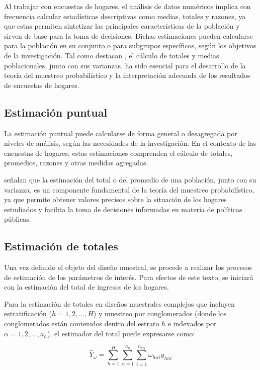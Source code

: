 \documentclass[
  spanish,
  12pt,
]{book}
\begin{document}
Al trabajar con encuestas de hogares, el análisis de datos numéricos implica con frecuencia calcular estadísticas descriptivas como medias, totales y razones, ya que estas permiten sintetizar las principales características de la población y sirven de base para la toma de decisiones. Dichas estimaciones pueden calcularse para la población en su conjunto o para subgrupos específicos, según los objetivos de la investigación. Tal como destacan \citet{heeringa2017applied}, el cálculo de totales y medias poblacionales, junto con sus varianzas, ha sido esencial para el desarrollo de la teoría del muestreo probabilístico y la interpretación adecuada de los resultados de encuestas de hogares.

\subsection{Estimación puntual}\label{estimaciuxf3n-puntual}

La estimación puntual puede calcularse de forma general o desagregada por niveles de análisis, según las necesidades de la investigación. En el contexto de las encuestas de hogares, estas estimaciones comprenden el cálculo de totales, promedios, razones y otras medidas agregadas.

\citet{heeringa2017applied} señalan que la estimación del total o del promedio de una población, junto con su varianza, es un componente fundamental de la teoría del muestreo probabilístico, ya que permite obtener valores precisos sobre la situación de los hogares estudiados y facilita la toma de decisiones informadas en materia de políticas públicas.

\subsection{Estimación de totales}\label{estimaciuxf3n-de-totales-1}

Una vez definido el objeto del diseño muestral, se procede a realizar los procesos de estimación de los parámetros de interés. Para efectos de este texto, se iniciará con la estimación del total de ingresos de los hogares.

Para la estimación de totales en diseños muestrales complejos que incluyen estratificación (\(h = 1, 2, \ldots, H\)) y muestreo por conglomerados (donde los conglomerados están contenidos dentro del estrato \(h\) e indexados por \(\alpha = 1, 2, \ldots, a_h\)), el estimador del total puede expresarse como:

\[
\hat{Y}_{\omega} = \sum_{h=1}^{H}\sum_{\alpha=1}^{a_h}\sum_{i=1}^{n_{h\alpha}}\omega_{h\alpha i} y_{h\alpha i}
\]
\end{document}
